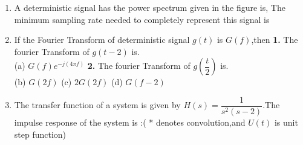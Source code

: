 \documentclass[journal,12pt,twocolumn]{IEEEtran}
\begin{document}
\begin{enumerate}[1.]
\begin{enumerate}[(A)]
\end{enumerate}

\item A deterministic signal has the power spectrum given in the figure is, The minimum sampling rate needed to completely represent this signal is\\
\begin{enumerate}[(A)]
\end{enumerate}

\item If the Fourier Transform of deterministic signal $g(t)$ is $G(f)$,then \newline \textbf{1.} The fourier Transform of $g(t-2)$ is.\\
        (a) $G(f)e^{-j(4\pi f)}$
       \newline \textbf{2.} The fourier Transform of $g(\dfrac{t}{2})$ is.\\
  			  (b) $G(2f)$
              (c) $2G(2f)$
              (d) $G(f-2)$

\item The transfer function of a system is given by $H(s)=\dfrac{1}{s^{2}(s-2)}$.The impulse response of the system is :( * denotes convolution,and $U(t)$ is unit step function)

\begin{enumerate}[(A)]
\end{enumerate}
\end{enumerate}
\end{document}
